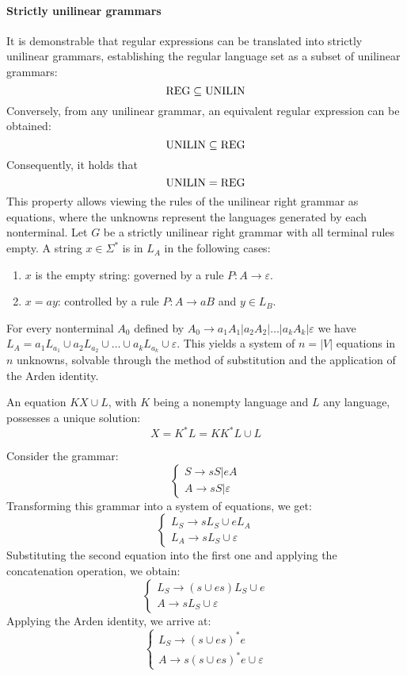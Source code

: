 \paragraph*{Strictly unilinear grammars}
It is demonstrable that regular expressions can be translated into strictly unilinear grammars, establishing the regular language set as a subset of unilinear grammars:
\[\textnormal{REG} \subseteq \textnormal{UNILIN}\]
Conversely, from any unilinear grammar, an equivalent regular expression can be obtained:
\[\textnormal{UNILIN} \subseteq \textnormal{REG}\]
Consequently, it holds that
\[\textnormal{UNILIN}=\textnormal{REG}\]
This property allows viewing the rules of the unilinear right grammar as equations, where the unknowns represent the languages generated by each nonterminal.
Let $G$ be a strictly unilinear right grammar with all terminal rules empty.
A string $x \in \Sigma^{*}$ is in $L_A$ in the following cases:
\begin{enumerate}
    \item $x$ is the empty string: governed by a rule $P: A \rightarrow \varepsilon$.
    \item $x=ay$: controlled by a rule $P: A \rightarrow aB$ and $y \in L_B$.
\end{enumerate}
For every nonterminal $A_0$ defined by $A_0 \rightarrow a_1A_1|a_2A_2|\dots|a_kA_k|\varepsilon$ we have $L_A=a_1L_{a_1} \cup a_2L_{a_2} \cup \dots \cup a_kL_{a_k} \cup \varepsilon$. 
This yields a system of $n=\left\lvert V \right\rvert$ equations in $n$ unknowns, solvable through the method of substitution and the application of the Arden identity.
\begin{definition}
    An equation $KX \cup L$, with $K$ being a nonempty language and $L$ any language, possesses a unique solution: 
    \[X=K^{*}L=KK^{*}L \cup L\]
\end{definition}
\begin{example}
    Consider the grammar: 
    \[\begin{cases}
        S \rightarrow sS | eA \\
        A \rightarrow sS | \varepsilon
    \end{cases}\]
    Transforming this grammar into a system of equations, we get:
    \[\begin{cases}
        L_S \rightarrow sL_S \cup eL_A \\
        L_A \rightarrow sL_S \cup \varepsilon
    \end{cases}\]
    Substituting the second equation into the first one and applying the concatenation operation, we obtain:
    \[\begin{cases}
        L_S \rightarrow (s \cup es)L_S \cup e \\
        A \rightarrow sL_S \cup \varepsilon
    \end{cases}\]
    Applying the Arden identity, we arrive at:
    \[\begin{cases}
        L_S \rightarrow (s \cup es)^{*}e \\
        A \rightarrow s(s \cup es)^{*}e \cup \varepsilon
    \end{cases}\]
\end{example}
